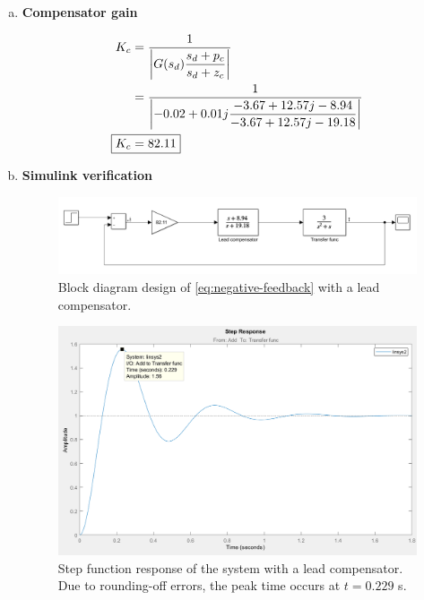 \documentclass[12pt,a4paper]{article}
\newcommand\ddfrac[2]{\frac{\displaystyle #1}{\displaystyle #2}}
\begin{document}
\begin{enumerate}[(a)]
\item \textbf{Compensator gain}

\begin{align}
	K_c &= \ddfrac{1}{\abs{G(s_d)\frac{s_d + p_c}{s_d + z_c}}} \\
	&= \ddfrac{1}{\abs{-0.02 + 0.01j \frac{-3.67 + 12.57j - 8.94}{-3.67 + 12.57j - 19.18}}} \\
	\Aboxed{
		K_c &= 82.11
	} \label{eq:compensator-gain}
\end{align}

\item \textbf{Simulink verification}

\begin{figure}[h!]
	\centering
	\includegraphics[width=0.9\linewidth]{compensator-design.png}
	\caption{Block diagram design of \eqref{eq:negative-feedback} with a lead compensator.}
	\label{fig:comp-design}
\end{figure}

\begin{figure}[h!]
	\centering
	\includegraphics[width=0.9\linewidth]{compensator-step.png}
	\caption{Step function response of the system with a lead compensator. Due to rounding-off errors, the peak time occurs at  $t = 0.229$ s.}
	\label{fig:comp-design}
\end{figure}


\end{enumerate}
\end{document}
